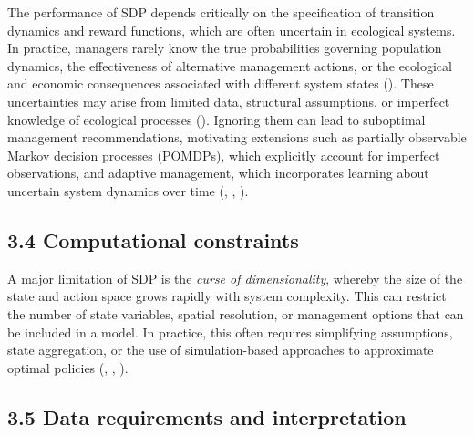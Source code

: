 \documentclass[
  11pt,
  a4paper,
]{article}
\begin{document}
The performance of SDP depends critically on the specification of transition dynamics and reward functions, which are often uncertain in ecological systems. In practice, managers rarely know the true probabilities governing population dynamics, the effectiveness of alternative management actions, or the ecological and economic consequences associated with different system states (). These uncertainties may arise from limited data, structural assumptions, or imperfect knowledge of ecological processes (). Ignoring them can lead to suboptimal management recommendations, motivating extensions such as partially observable Markov decision processes (POMDPs), which explicitly account for imperfect observations, and adaptive management, which incorporates learning about uncertain system dynamics over time (, , ).

\subsection{3.4 Computational constraints}\label{computational-constraints}

A major limitation of SDP is the \emph{curse of dimensionality}, whereby the size of the state and action space grows rapidly with system complexity. This can restrict the number of state variables, spatial resolution, or management options that can be included in a model. In practice, this often requires simplifying assumptions, state aggregation, or the use of simulation-based approaches to approximate optimal policies (, , ).

\subsection{3.5 Data requirements and interpretation}\label{data-requirements-and-interpretation}
\end{document}
